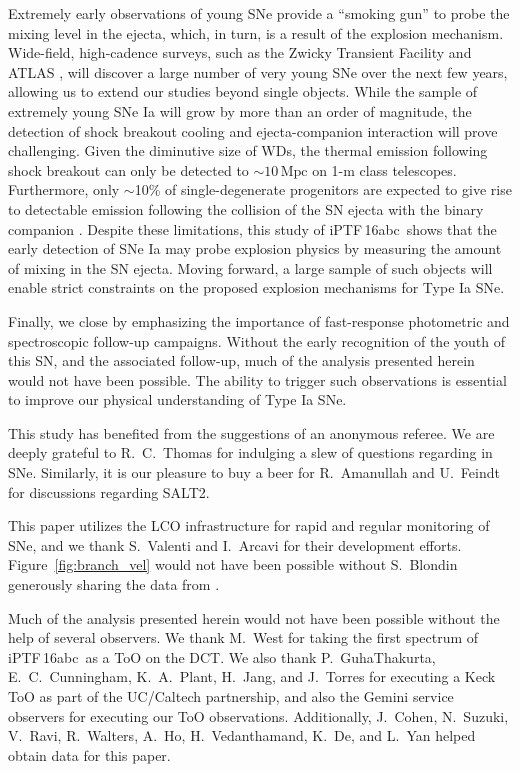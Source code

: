 \documentclass[twocolumn]{aastex61}
\newcommand{\abc}{iPTF\,16abc}
\begin{document}
Extremely early observations of young SNe provide a ``smoking
gun'' to probe the mixing level in the ejecta, which, in turn, is 
a result of the explosion mechanism. Wide-field, high-cadence surveys, such as the Zwicky Transient Facility \citep{2016PASP..128h4501B} and ATLAS \citep{2011PASP..123...58T,2013RSPTA.37120269T}, will discover a large number of very young SNe over the next few years, allowing us to extend our studies beyond single objects. While the sample of extremely young SNe Ia will grow by more than an order of magnitude, the detection of shock breakout cooling and ejecta-companion interaction will prove challenging. Given the diminutive size of WDs, the thermal emission following shock breakout can only be detected to $\sim 10\,\mathrm{Mpc}$ on 1-m class telescopes. Furthermore, only $\sim$10\% of single-degenerate progenitors are expected to give rise to detectable emission following the collision of the SN ejecta with the binary companion \citep{2010ApJ...708.1025K}. Despite these limitations, this study of \abc\ shows that the early detection of SNe Ia may probe explosion physics by measuring the amount of mixing in the SN ejecta. Moving forward, a large sample of such objects will enable strict constraints on the proposed explosion mechanisms for Type Ia SNe.

Finally, we close by emphasizing the importance of fast-response photometric and spectroscopic follow-up campaigns. Without the early recognition of the youth of this SN, and the associated follow-up, much of the analysis presented herein would not have been possible. The ability to trigger such observations is essential to improve our physical understanding of Type Ia SNe.

\acknowledgements

This study has benefited from the suggestions of an anonymous
referee. We are deeply grateful to R.~C.~Thomas for indulging a slew of
questions regarding  in SNe. Similarly, it is our pleasure to buy a
beer for R.~Amanullah and U.~Feindt for discussions regarding SALT2.

This paper utilizes the LCO infrastructure for rapid and regular monitoring of
SNe, and we thank S.~Valenti and I.~Arcavi for their development efforts.
Figure~\ref{fig:branch_vel} would not have been possible without
S.~Blondin generously sharing the data from \citet{2012AJ....143..126B}.

Much of the analysis presented herein would not have been possible without the
help of several observers. We thank M.~West for taking the first spectrum of
\abc\ as a ToO on the DCT. We also thank P.~GuhaThakurta, E.~C.~Cunningham,
K.~A.~Plant, H.~Jang, and J.~Torres for executing a Keck ToO as part of the
UC/Caltech partnership, and also the Gemini service observers for executing
our ToO observations. Additionally, J.~Cohen, N.~Suzuki, V.~Ravi, R.~Walters,
A.~Ho, H.~Vedanthamand, K.~De, and L.~Yan helped obtain data for this paper.
\end{document}

